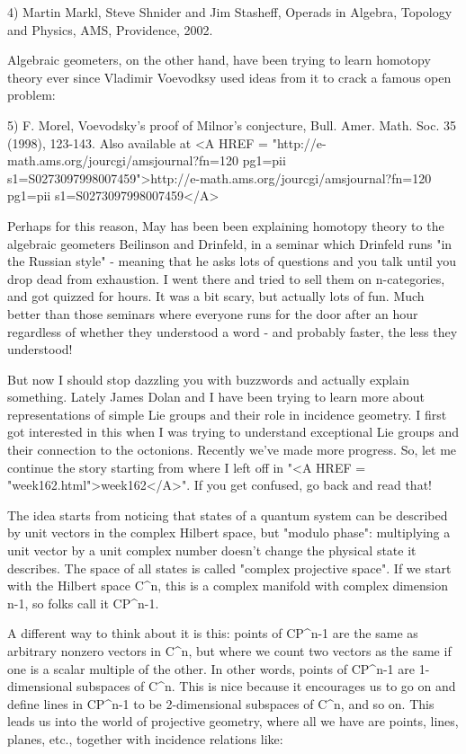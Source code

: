 4) Martin Markl, Steve Shnider and Jim Stasheff, Operads in Algebra,
Topology and Physics, AMS, Providence, 2002.

Algebraic geometers, on the other hand, have been trying to learn
homotopy theory ever since Vladimir Voevodksy used ideas from it to
crack a famous open problem:

5) F. Morel, Voevodsky's proof of Milnor's conjecture, Bull. 
Amer. Math. Soc. 35 (1998), 123-143.  Also available at
<A HREF = "http://e-math.ams.org/jourcgi/amsjournal?fn=120\text{\&} pg1=pii\text{\&} s1=S0273097998007459">http://e-math.ams.org/jourcgi/amsjournal?fn=120\text{\&} pg1=pii\text{\&} s1=S0273097998007459</A>

Perhaps for this reason, May has been been explaining homotopy theory
to the algebraic geometers Beilinson and Drinfeld, in a seminar which
Drinfeld runs "in the Russian style" - meaning that he asks lots of
questions and you talk until you drop dead from exhaustion.  I went
there and tried to sell them on n-categories, and got quizzed for hours.
It was a bit scary, but actually lots of fun.  Much better than those
seminars where everyone runs for the door after an hour regardless of
whether they understood a word - and probably faster, the less they
understood!  

But now I should stop dazzling you with buzzwords and actually explain
something.  Lately James Dolan and I have been trying to learn more
about representations of simple Lie groups and their role in incidence
geometry.  I first got interested in this when I was trying to
understand exceptional Lie groups and their connection to the octonions.
Recently we've made more progress.  So, let me continue the story
starting from where I left off in "<A HREF = "week162.html">week162</A>".  If you get confused, go back and read that!

The idea starts from noticing that states of a quantum system can be
described by unit vectors in the complex Hilbert space, but "modulo
phase": multiplying a unit vector by a unit complex number doesn't
change the physical state it describes.  The space of all states is
called "complex projective space".  If we start with the
Hilbert space C^{n}, this is a complex manifold with complex dimension
n-1, so folks call it CP^{n-1}.

A different way to think about it is this: points of CP^{n-1}
are the same as arbitrary nonzero vectors in C^{n}, but where we
count two vectors as the same if one is a scalar multiple of the other.
In other words, points of CP^{n-1} are 1-dimensional subspaces
of C^{n}.  This is nice because it encourages us to go on and
define lines in CP^{n-1} to be 2-dimensional subspaces of
C^{n}, and so on.  This leads us into the world of projective
geometry, where all we have are points, lines, planes, etc., together
with incidence relations like:

